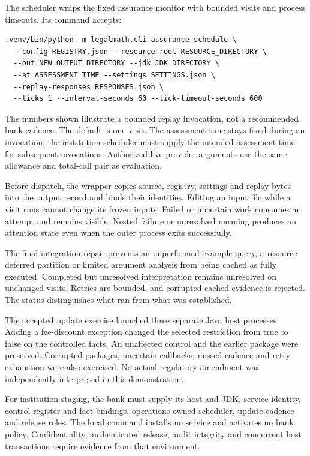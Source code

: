 The scheduler wraps the fixed assurance monitor with bounded visits and process
timeouts. Its command accepts:
\begin{lstlisting}
.venv/bin/python -m legalmath.cli assurance-schedule \
  --config REGISTRY.json --resource-root RESOURCE_DIRECTORY \
  --out NEW_OUTPUT_DIRECTORY --jdk JDK_DIRECTORY \
  --at ASSESSMENT_TIME --settings SETTINGS.json \
  --replay-responses RESPONSES.json \
  --ticks 1 --interval-seconds 60 --tick-timeout-seconds 600
\end{lstlisting}
The numbers shown illustrate a bounded replay invocation, not a recommended
bank cadence. The default is one visit. The assessment time stays fixed during
an invocation; the institution scheduler must supply the intended assessment
time for subsequent invocations. Authorized live provider arguments use the
same allowance and total-call pair as evaluation.

Before dispatch, the wrapper copies source, registry, settings and replay bytes
into the output record and binds their identities. Editing an input file while
a visit runs cannot change its frozen inputs. Failed or uncertain work consumes
an attempt and remains visible. Nested failure or unresolved meaning produces
an attention state even when the outer process exits successfully.

The final integration repair prevents an unperformed example query, a
resource-deferred partition or limited argument analysis from being cached as
fully executed. Completed but unresolved interpretation remains unresolved on
unchanged visits. Retries are bounded, and corrupted cached evidence is rejected.
The status distinguishes what ran from what was established.

The accepted update exercise launched three separate Java host processes.
Adding a fee-discount exception changed the selected restriction from true to
false on the controlled facts. An unaffected control and the earlier package
were preserved. Corrupted packages, uncertain callbacks, missed cadence and
retry exhaustion were also exercised. No actual regulatory amendment was
independently interpreted in this demonstration.

For institution staging, the bank must supply its host and JDK, service identity,
control register and fact bindings, operations-owned scheduler, update cadence
and release roles. The local command installs no service and activates no bank
policy. Confidentiality, authenticated release, audit integrity and concurrent
host transactions require evidence from that environment.

